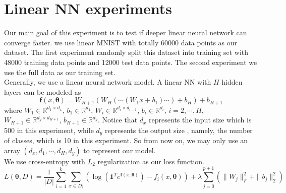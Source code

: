 
\section{Linear NN experiments}
Our main goal of this experiment is to test if deeper linear neural network can converge faster. we use linear MNIST with totally 60000 data points as our dataset. The first experiment randomly split this dataset into training set with 48000 training data points and 12000 test data points. The second experiment we use the full data as our training set.\\
Generally, we use a linear neural network model.  A linear NN with $H$ hidden layers can be modeled as
\begin{equation}
	\bm f(x,\bm\theta) = W_{H+1}(W_H(\cdots(W_1 x + b_1)\cdots)+b_H)+b_{H+1}
\end{equation}
where $W_1\in \mathbb{R}^{d_1\times d_x}$, $b_1 \in \mathbb{R}^{d_1}$, $W_i\in \mathbb{R}^{d_{i}\times d_{i-1}}$, $b_i \in \mathbb{R}^{d_i}$, $i = 2,\cdots,H$, $W_{H+1}\in \mathbb{R}^{d_y\times d_{H+1}}$, $b_{H+1} \in \mathbb{R}^{d_y}$. Notice that $d_x$ represents the input size which is 500 in this experiment, while $d_y$ represents the output size , namely, the number of classes, which is 10 in this experiment. So from now on, we may only  use an array $(d_x,d_1,\cdots,d_H,d_y)$ to represent our model.\\
We use cross-entropy with $L_2$ regularization as our loss function.
\begin{equation}
	L(\bm\theta,D) = \frac{1}{|D|} \sum_{i = 1}^k \sum_{x\in D_i} (\log ({\bm 1}^T e^{\bm f(x,\bm\theta)}) - f_i(x,\bm\theta)) + \lambda \sum_{j = 0}^{p+1} (\|W_j\|_F^2 + \|b_j\|_2^2)
\end{equation}

